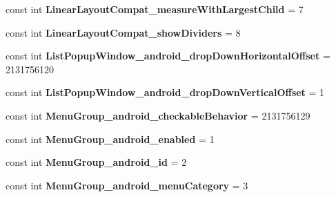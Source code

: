 \begin{DoxyCompactItemize}
\mbox{\label{classst_delivery_1_1_resource_1_1_styleable_a7a22b7f135e82a85d1edee41d360598d}} 
const int {\bfseries Linear\+Layout\+Compat\+\_\+measure\+With\+Largest\+Child} = 7
\item 
\mbox{\label{classst_delivery_1_1_resource_1_1_styleable_aa6a233840e5137f30bf441b826aa396d}} 
const int {\bfseries Linear\+Layout\+Compat\+\_\+show\+Dividers} = 8
\item 
\mbox{\label{classst_delivery_1_1_resource_1_1_styleable_a36960bbb2ffd4dfb5310337f0b34d7c6}} 
const int {\bfseries List\+Popup\+Window\+\_\+android\+\_\+drop\+Down\+Horizontal\+Offset} = 2131756120
\item 
\mbox{\label{classst_delivery_1_1_resource_1_1_styleable_aaea7ae330e0c6426f88928e5c4082e64}} 
const int {\bfseries List\+Popup\+Window\+\_\+android\+\_\+drop\+Down\+Vertical\+Offset} = 1
\item 
\mbox{\label{classst_delivery_1_1_resource_1_1_styleable_ac1bbbfa899056761e36170af1b8a5ba5}} 
const int {\bfseries Menu\+Group\+\_\+android\+\_\+checkable\+Behavior} = 2131756129
\item 
\mbox{\label{classst_delivery_1_1_resource_1_1_styleable_a0fe920a26957f7574f11619fb2919dda}} 
const int {\bfseries Menu\+Group\+\_\+android\+\_\+enabled} = 1
\item 
\mbox{\label{classst_delivery_1_1_resource_1_1_styleable_ac43e87e7a8eeda78258f552fba5d4e6e}} 
const int {\bfseries Menu\+Group\+\_\+android\+\_\+id} = 2
\item 
\mbox{\label{classst_delivery_1_1_resource_1_1_styleable_acb8e38506172b3812f5961af11510f00}} 
const int {\bfseries Menu\+Group\+\_\+android\+\_\+menu\+Category} = 3
\item 
\mbox{\label{classst_delivery_1_1_resource_1_1_styleable_a7e2299dbd9ad138578446040eaae7433}} 

\end{DoxyCompactItemize}
